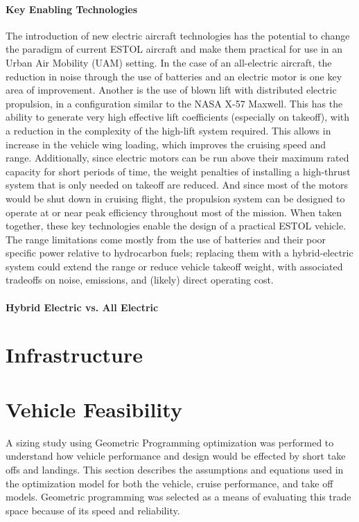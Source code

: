 \documentclass[]{aiaa-tc}%
\begin{document}
\paragraph{Key Enabling Technologies} The introduction of new electric aircraft technologies has the potential to change the paradigm of current ESTOL aircraft and make them practical for use in an Urban Air Mobility (UAM) setting.   In the case of an all-electric aircraft, the reduction in noise through the use of batteries and an electric motor is one key area of improvement.  Another is the use of blown lift with distributed electric propulsion, in a configuration similar to the NASA X-57 Maxwell.  This has the ability to generate very high effective lift coefficients (especially on takeoff), with a reduction in the complexity of the high-lift system required.  This allows in increase in the vehicle wing loading, which improves the cruising speed and range.  
Additionally, since electric motors can be run above their maximum rated capacity for short periods of time, the weight penalties of installing a high-thrust system that is only needed on takeoff are reduced.  And since most of the motors would be shut down in cruising flight, the propulsion system can be designed to operate at or near peak efficiency throughout most of the mission.  When taken together, these key technologies enable the design of a practical ESTOL vehicle.  The range limitations come mostly from the use of batteries and their poor specific power relative to hydrocarbon fuels; replacing them with a hybrid-electric system could extend the range or reduce vehicle takeoff weight, with associated tradeoffs on noise, emissions, and (likely) direct operating cost.  
 
\paragraph{Hybrid Electric vs. All Electric} 



\section{Infrastructure}

\section{Vehicle Feasibility}

A sizing study using Geometric Programming optimization was performed to understand how vehicle performance and design would be effected by short take offs and landings. 
This section describes the assumptions and equations used in the optimization model for both the vehicle, cruise performance, and take off models.
Geometric programming was selected as a means of evaluating this trade space because of its speed and reliability.  
\end{document}
